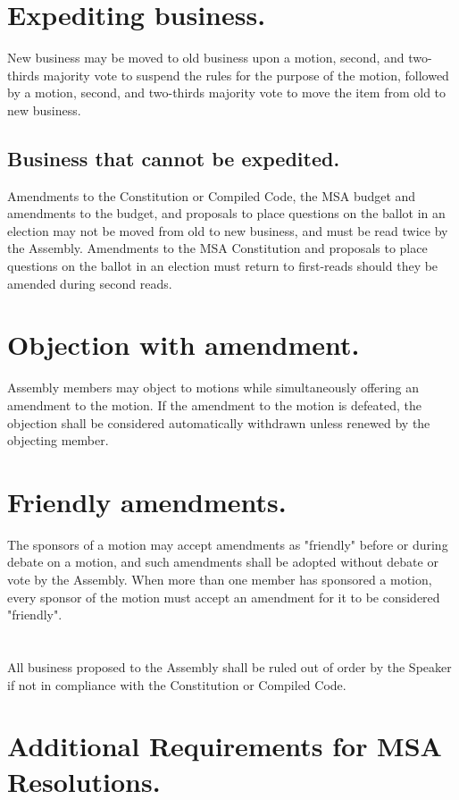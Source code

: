\documentclass{rules}
\begin{document}
\section{Expediting business.}
New business may be moved to old business upon a motion, second, and two-thirds majority vote to suspend the rules for the purpose of the motion, followed by a motion, second, and two-thirds majority vote to move the item from old to new business.
\subsection{Business that cannot be expedited.}
Amendments to the Constitution or Compiled Code, the MSA budget and amendments to the budget, and proposals to place questions on the ballot in an election may not be moved from old to new business, and must be read twice by the Assembly. Amendments to the MSA Constitution and proposals to place questions on the ballot in an election must return to first-reads should they be amended during second reads.

\section{Objection with amendment.}
Assembly members may object to motions while simultaneously offering an amendment to the motion.  If the amendment to the motion is defeated, the objection shall be considered automatically withdrawn unless renewed by the objecting member.

\section{Friendly amendments.}
The sponsors of a motion may accept amendments as "friendly" before or during debate on a motion, and such amendments shall be adopted without debate or vote by the Assembly.  When more than one member has sponsored a motion, every sponsor of the motion must accept an amendment for it to be considered "friendly".

\section{}
All business proposed to the Assembly shall be ruled out of order by the Speaker if not in compliance with the Constitution or Compiled Code.


\section{Additional Requirements for MSA Resolutions.}
\end{document}
